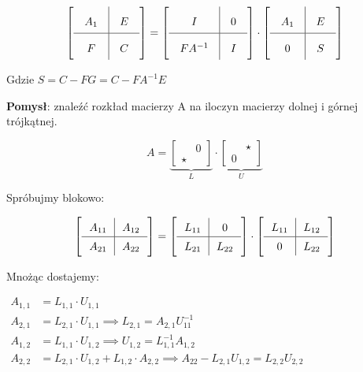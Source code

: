 \documentclass[hidelinks,a4paper]{article}
\newcommand{\eye}{I}
\begin{document}
\[\arraycolsep=1em\def\arraystretch{2}
	\left[
		\begin{array}{c|c}
			A_1 & E \\ \hline
			F   & C 
		\end{array}
	\right] =
	\left[
		\begin{array}{c|c}
			\eye     & 0 \\ \hline
			F A^{-1} & I 
		\end{array}
	\right]
	\cdot 
	\left[
		\begin{array}{c|c}
			A_1 & E \\ \hline
			0   & S 
		\end{array}
	\right]
\]

Gdzie $S = C - FG = C - FA^{-1}E$


\textbf{Pomysł}: znaleźć rozkład macierzy A na iloczyn macierzy dolnej i górnej trójkątnej.

\[
	A = \underbrace{\left[
			\begin{array}{cc}
				      & 0 \\
				\star &   
			\end{array}
		\right]}_{L} \cdot
	\underbrace{\left[
			\begin{array}{cc}
				  & \star \\
				0 &       
			\end{array}
		\right]}_{U}
\]

Spróbujmy blokowo:

\[\arraycolsep=0.7em\def\arraystretch{1.4}
	\left[
		\begin{array}{c|c}
			A_{11} & A_{12} \\ \hline
			A_{21} & A_{22} 
		\end{array}
	\right] =
	\left[
		\begin{array}{c|c}
			L_{11} & 0      \\ \hline
			L_{21} & L_{22} 
		\end{array}
	\right]
	\cdot 
	\left[
		\begin{array}{c|c}
			L_{11} & L_{12} \\ \hline
			0      & L_{22} 
		\end{array}
	\right]
\]

Mnożąc dostajemy:

$
\begin{array}{ll}
	A_{1,1} & = L_{1,1} \cdot U_{1,1}                                                                           \\
	A_{2,1} & = L_{2,1} \cdot U_{1,1} \implies L_{2,1} = A_{2,1}U_{11}^{-1}                                     \\
	A_{1,2} & = L_{1,1} \cdot U_{1,2}  \implies U_{1,2} = L^{-1}_{1,1} A_{1,2}                                  \\
	A_{2,2} & = L_{2,1} \cdot U_{1,2} + L_{1,2} \cdot A_{2,2} \implies A_{22} - L_{2,1}U_{1,2} = L_{2,2}U_{2,2} 
\end{array}
$
\end{document}
